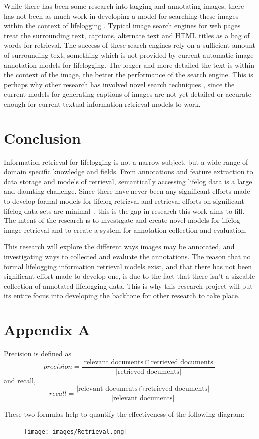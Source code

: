 \documentclass[12pt,a4paper]{article}
\begin{document}
While there has been some research into tagging and annotating images, there has not been as much work in developing a model for searching these images within the context of lifelogging \citep{gurrin2014lifelogging}. Typical image search engines for web pages treat the surrounding text, captions, alternate text and HTML titles \citep{frankel1996webseer} as a bag of words for retrieval. The success of these search engines rely on a sufficient amount of surrounding text, something which is not provided by current automatic image annotation models for lifelogging. The longer and more detailed the text is within the context of the image, the better the performance of the search engine. This is perhaps why other research has involved novel search techniques \citep{vuurpij2002vind}, since the current models for generating captions of images are not yet detailed or accurate enough for current textual information retrieval models to work.

\section{Conclusion}
Information retrieval for lifelogging is not a narrow subject, but a wide range of domain specific knowledge and fields. From annotations and feature extraction to data storage and models of retrieval, semantically accessing lifelog data is a large and daunting challenge. Since there have never been any significant efforts made to develop formal models for lifelog retrieval and retrieval efforts on significant lifelog data sets are minimal~\cite{gurrin2014lifelogging}, this is the gap in research this work aims to fill. The intent of the research is to investigate and create novel models for lifelog image retrieval and to create a system for annotation collection and evaluation.

This research will explore the different ways images may be annotated, and investigating ways to collected and evaluate the annotations. The reason that no formal lifelogging information retrieval models exist, and that there has not been significant effort made to develop one, is due to the fact that there isn't a sizeable collection of annotated lifelogging data. This is why this research project will put its entire focus into developing the backbone for other research to take place.

%



\section{Appendix A}
Precision is defined as 
\begin{equation}
precision = \frac{| \text{relevant documents}\cap\text{retrieved documents}|}{|\text{retrieved documents}|}
\end{equation} and recall,
\begin{equation}
recall = \frac{| \text{relevant documents}\cap\text{retrieved documents}|}{|\text{relevant documents}|}
\end{equation}

These two formulas help to quantify the effectiveness of the following diagram:
\begin{figure}[H]
    \centering
    \texttt{[image: images/Retrieval.png]}
\end{figure}
\end{document}
